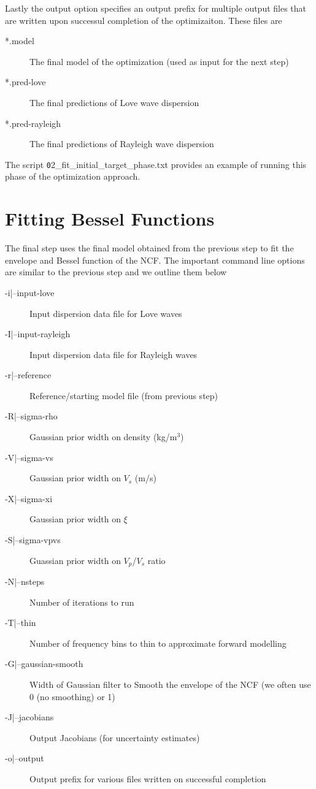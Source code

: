 \documentclass{article}
\begin{document}
Lastly the output option specifies an output prefix for multiple output files
that are written upon successul completion of the optimizaiton. These files
are

\begin{description}
\item[*.model] The final model of the optimization (used as input for the next step)
\item[*.pred-love] The final predictions of Love wave dispersion
\item[*.pred-rayleigh] The final predictions of Rayleigh wave dispersion
\end{description}

The script {\texttt 02\_fit\_initial\_target\_phase.txt} provides an example
of running this phase of the optimization approach.


\section{Fitting Bessel Functions}

The final step uses the final model obtained from the previous step to
fit the envelope and Bessel function of the NCF. The important command line options
are similar to the previous step and we outline them below

\begin{description}
\item [-i|--input-love] Input dispersion data file for Love waves
\item [-I|--input-rayleigh] Input dispersion data file for Rayleigh waves
\item [-r|--reference] Reference/starting model file (from previous step)
\item [-R|--sigma-rho] Gaussian prior width on density (kg/m$^3$)
\item [-V|--sigma-vs] Gaussian prior width on $V_s$ (m/s)
\item [-X|--sigma-xi] Gaussian prior width on $\xi$
\item [-S|--sigma-vpvs] Guassian prior width on $V_p$/$V_s$ ratio
\item [-N|--nsteps] Number of iterations to run
\item [-T|--thin] Number of frequency bins to thin to approximate forward modelling
\item [-G|--gaussian-smooth] Width of Gaussian filter to Smooth the envelope of the NCF (we often use 0 (no smoothing) or 1)
\item [-J|--jacobians] Output Jacobians (for uncertainty estimates)
\item [-o|--output] Output prefix for various files written on successful completion
\end{description}
\end{document}
